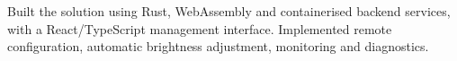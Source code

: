 Built the solution using Rust, WebAssembly and containerised backend services, with a React/TypeScript management interface. Implemented remote configuration, automatic brightness adjustment, monitoring and diagnostics.

